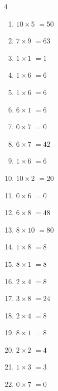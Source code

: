 \begin{multicols}{4}
\begin{enumerate}
  \item $10\times 5$
        $=50$

  \item $7\times 9$
        $=63$

  \item $1\times 1$
        $=1$

  \item $1\times 6$
        $=6$

  \item $1\times 6$
        $=6$

  \item $6\times 1$
        $=6$

  \item $0\times 7$
        $=0$

  \item $6\times 7$
        $=42$

  \item $1\times 6$
        $=6$

  \item $10\times 2$
        $=20$

  \item $0\times 6$
        $=0$

  \item $6\times 8$
        $=48$

\columnbreak %

\resetques

  \item $8\times 10$
        $=80$

  \item $1\times 8$
        $=8$

  \item $8\times 1$
        $=8$

  \item $2\times 4$
        $=8$

  \item $3\times 8$
        $=24$

  \item $2\times 4$
        $=8$

  \item $8\times 1$
        $=8$

  \item $2\times 2$
        $=4$

  \item $1\times 3$
        $=3$

  \item $0\times 7$
        $=0$


\end{enumerate}
\end{multicols}
